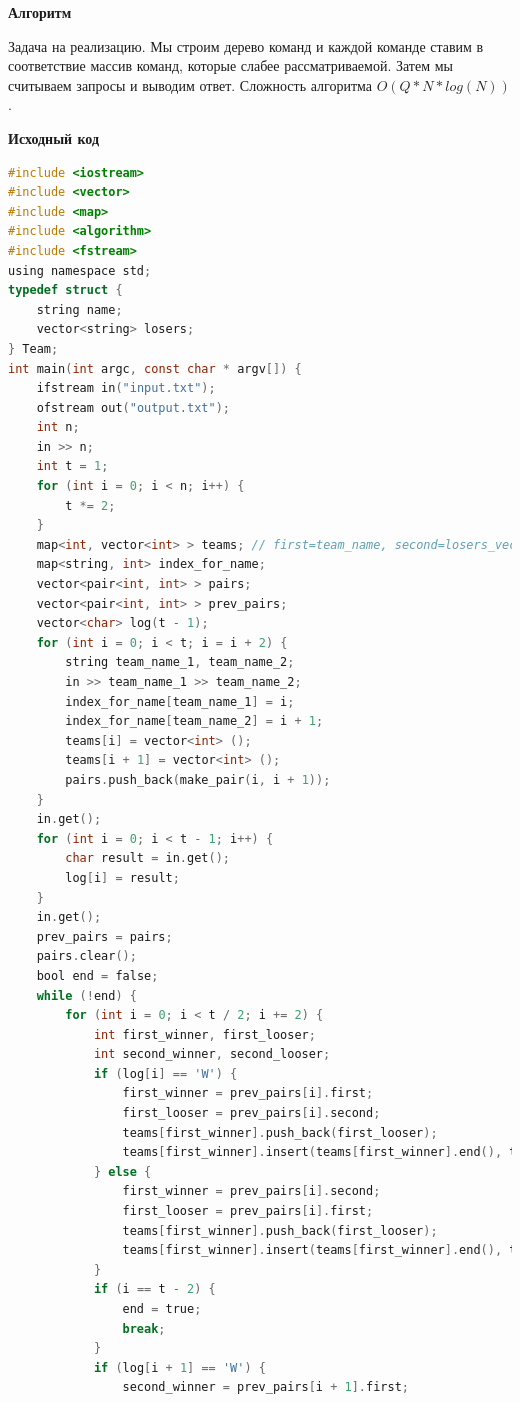 \documentclass[a4paper,12pt]{article}
\begin{document}
\textbf{{\large Алгоритм}}

Задача на реализацию. Мы строим дерево команд и каждой команде ставим в соответствие массив команд, которые слабее рассматриваемой. Затем мы считываем запросы и выводим ответ. Сложность алгоритма $O(Q * N * log(N))$.

\newpage
\textbf{{\large Исходный код}} \\
\begin{lstlisting}[language=C]
#include <iostream>
#include <vector>
#include <map>
#include <algorithm>
#include <fstream>
using namespace std;
typedef struct {
    string name;
    vector<string> losers;
} Team;
int main(int argc, const char * argv[]) {
    ifstream in("input.txt");
    ofstream out("output.txt");
    int n;
    in >> n;
    int t = 1;
    for (int i = 0; i < n; i++) {
        t *= 2;
    }
    map<int, vector<int> > teams; // first=team_name, second=losers_vector
    map<string, int> index_for_name;
    vector<pair<int, int> > pairs;
    vector<pair<int, int> > prev_pairs;
    vector<char> log(t - 1);
    for (int i = 0; i < t; i = i + 2) {
        string team_name_1, team_name_2;
        in >> team_name_1 >> team_name_2;
        index_for_name[team_name_1] = i;
        index_for_name[team_name_2] = i + 1;
        teams[i] = vector<int> ();
        teams[i + 1] = vector<int> ();
        pairs.push_back(make_pair(i, i + 1));
    }
    in.get();
    for (int i = 0; i < t - 1; i++) {
        char result = in.get();
        log[i] = result;
    }
    in.get();
    prev_pairs = pairs;
    pairs.clear();
    bool end = false;
    while (!end) {
        for (int i = 0; i < t / 2; i += 2) {
            int first_winner, first_looser;
            int second_winner, second_looser;
            if (log[i] == 'W') {
                first_winner = prev_pairs[i].first;
                first_looser = prev_pairs[i].second;
                teams[first_winner].push_back(first_looser);
                teams[first_winner].insert(teams[first_winner].end(), teams[first_looser].begin(), teams[first_looser].end());
            } else {
                first_winner = prev_pairs[i].second;
                first_looser = prev_pairs[i].first;
                teams[first_winner].push_back(first_looser);
                teams[first_winner].insert(teams[first_winner].end(), teams[first_looser].begin(), teams[first_looser].end());
            }
            if (i == t - 2) {
                end = true;
                break;
            }
            if (log[i + 1] == 'W') {
                second_winner = prev_pairs[i + 1].first;

\end{lstlisting}
\end{document}
